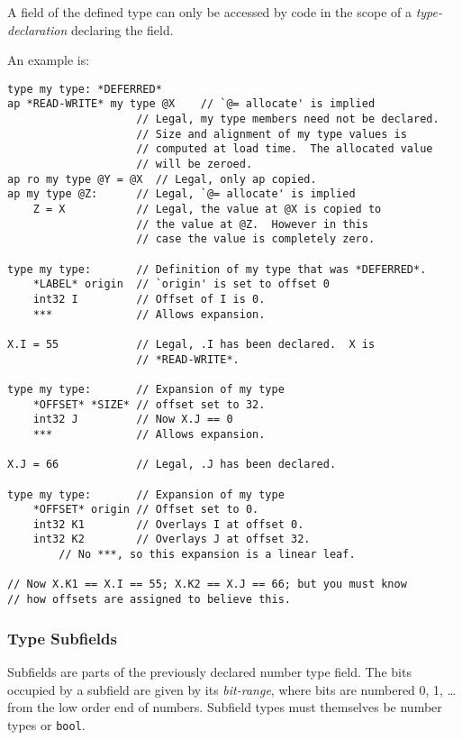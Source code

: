 \documentclass[12pt]{article}
\newenvironment{indpar}[1][0.3in]%
	{\begin{list}{}%
		     {\setlength{\itemsep}{0in}%
		      \setlength{\topsep}{0in}%
		      \setlength{\parsep}{1ex}%
		      \setlength{\labelwidth}{#1}%
		      \setlength{\leftmargin}{#1}%
		      \addtolength{\leftmargin}{\labelsep}}%
	 \item}%
	{\end{list}}
\begin{document}
A field of
the defined type can only be accessed by code in the scope
of a {\em type-declaration} declaring the field.

An example is:

\begin{indpar}\begin{verbatim}
type my type: *DEFERRED*
ap *READ-WRITE* my type @X    // `@= allocate' is implied
                    // Legal, my type members need not be declared.
                    // Size and alignment of my type values is
                    // computed at load time.  The allocated value
                    // will be zeroed.
ap ro my type @Y = @X  // Legal, only ap copied.
ap my type @Z:      // Legal, `@= allocate' is implied
    Z = X           // Legal, the value at @X is copied to
                    // the value at @Z.  However in this
                    // case the value is completely zero.

type my type:       // Definition of my type that was *DEFERRED*.
    *LABEL* origin  // `origin' is set to offset 0
    int32 I         // Offset of I is 0.
    ***             // Allows expansion.

X.I = 55            // Legal, .I has been declared.  X is
                    // *READ-WRITE*.

type my type:       // Expansion of my type
    *OFFSET* *SIZE* // offset set to 32.
    int32 J         // Now X.J == 0
    ***             // Allows expansion.

X.J = 66            // Legal, .J has been declared.

type my type:       // Expansion of my type
    *OFFSET* origin // Offset set to 0.
    int32 K1        // Overlays I at offset 0.
    int32 K2        // Overlays J at offset 32.
        // No ***, so this expansion is a linear leaf.

// Now X.K1 == X.I == 55; X.K2 == X.J == 66; but you must know
// how offsets are assigned to believe this.
\end{verbatim}\end{indpar}

\subsubsection{Type Subfields}

Subfields are parts of the previously declared number type field.
The bits occupied
by a subfield are given by its {\em bit-range}, where bits are numbered
0, 1, \ldots{} from the low order end of numbers.
Subfield types must themselves be number types or {\tt bool}.
\end{document}
